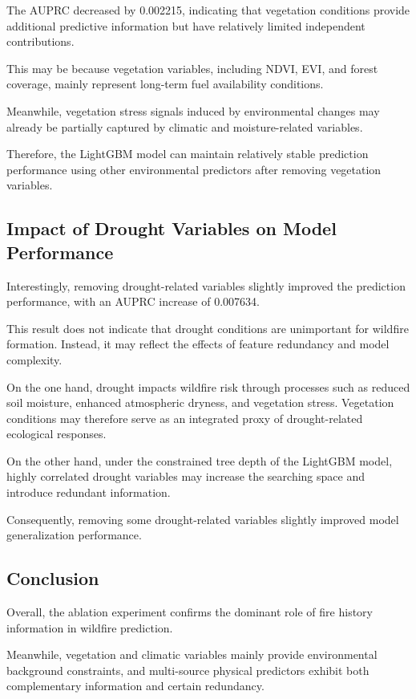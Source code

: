 The AUPRC decreased by 0.002215, indicating that vegetation conditions provide additional predictive information but have relatively limited independent contributions.

This may be because vegetation variables, including NDVI, EVI, and forest coverage, mainly represent long-term fuel availability conditions.

Meanwhile, vegetation stress signals induced by environmental changes may already be partially captured by climatic and moisture-related variables.

Therefore, the LightGBM model can maintain relatively stable prediction performance using other environmental predictors after removing vegetation variables.


\subsection{Impact of Drought Variables on Model Performance}

Interestingly, removing drought-related variables slightly improved the prediction performance, with an AUPRC increase of 0.007634.

This result does not indicate that drought conditions are unimportant for wildfire formation. Instead, it may reflect the effects of feature redundancy and model complexity.

On the one hand, drought impacts wildfire risk through processes such as reduced soil moisture, enhanced atmospheric dryness, and vegetation stress. Vegetation conditions may therefore serve as an integrated proxy of drought-related ecological responses.

On the other hand, under the constrained tree depth of the LightGBM model, highly correlated drought variables may increase the searching space and introduce redundant information.

Consequently, removing some drought-related variables slightly improved model generalization performance.


\subsection{Conclusion}

Overall, the ablation experiment confirms the dominant role of fire history information in wildfire prediction.

Meanwhile, vegetation and climatic variables mainly provide environmental background constraints, and multi-source physical predictors exhibit both complementary information and certain redundancy.